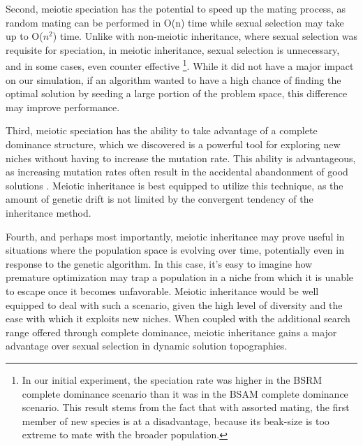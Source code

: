 \documentclass{article}
\begin{document}
Second, meiotic speciation has the potential to speed up the mating process, as random mating can be performed in O(n) time while sexual selection may take up to O($n^2$) time. Unlike with non-meiotic inheritance, where sexual selection was requisite for speciation, in meiotic inheritance, sexual selection is unnecessary, and in some cases, even counter effective \footnote{In our initial experiment, the speciation rate was higher in the BSRM complete dominance scenario than it was in the BSAM complete dominance scenario. This result stems from the fact that with assorted mating, the first member of new species is at a disadvantage, because its beak-size is too extreme to mate with the broader population.}. While it did not have a major impact on our simulation, if an algorithm wanted to have a high chance of finding the optimal solution by seeding a large portion of the problem space, this difference may improve performance. 

Third, meiotic speciation has the ability to take advantage of a complete dominance structure, which we discovered is a powerful tool for exploring new niches without having to increase the mutation rate. This ability is advantageous, as increasing mutation rates often result in the accidental abandonment of good solutions \cite{TAGGING}. Meiotic inheritance is best equipped to utilize this technique, as the amount of genetic drift is not limited by the convergent tendency of the inheritance method.

Fourth, and perhaps most importantly, meiotic inheritance may prove useful in situations where the population space is evolving over time, potentially even in response to the genetic algorithm. In this case, it's easy to imagine how premature optimization may trap a population in a niche from which it is unable to escape once it becomes unfavorable. Meiotic inheritance would be well equipped to deal with such a scenario, given the high level of diversity and the ease with which it exploits new niches. When coupled with the additional search range offered through complete dominance, meiotic inheritance gains a major advantage over sexual selection in dynamic solution topographies. 
\end{document}
